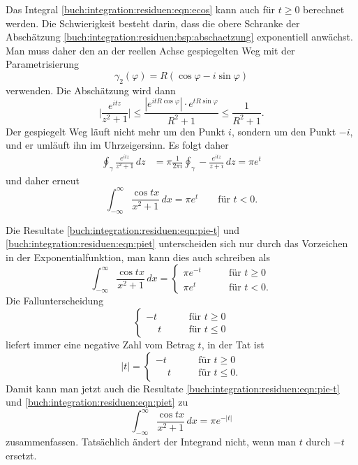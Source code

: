 Das Integral
\eqref{buch:integration:residuen:eqn:ecos}
kann auch für $t\ge 0$ berechnet werden.
Die Schwierigkeit besteht darin, dass die obere Schranke der Abschätzung
\eqref{buch:integration:residuen:bsp:abschaetzung}
exponentiell anwächst.
Man muss daher den an der reellen Achse gespiegelten Weg mit der
Parametrisierung
\[
\gamma_2(\varphi)
=
R(\cos\varphi - i\sin\varphi)
\]
verwenden.
Die Abschätzung wird dann
\[
\biggl|
\frac{e^{itz}}{z^2+1}
\biggr|
\le
\frac{|e^{itR\cos\varphi}|\cdot e^{tR\sin\varphi}}{R^2+1}
\le
\frac{1}{R^2+1}.
\]
Der gespiegelt Weg läuft nicht mehr um den Punkt $i$, sondern um den
Punkt $-i$, und er umläuft ihn im Uhrzeigersinn.
Es folgt daher
\begin{align*}
\oint_\gamma
\frac{e^{itz}}{z^2+1}
\,dz
&=
\pi
\frac{1}{2\pi i}
\oint_{\gamma}
-
\frac{e^{itz}}{z+i}
\,dz
=
\pi e^{t}
\end{align*}
und daher erneut
\begin{equation}
\int_{-\infty}^\infty
\frac{\cos tx}{x^2 + 1}
\,dx
=
\pi e^{t}
\qquad
\text{für $t<0$}.
\label{buch:integration:residuen:eqn:piet}
\end{equation}

Die Resultate
\eqref{buch:integration:residuen:eqn:pie-t}
und
\eqref{buch:integration:residuen:eqn:piet}
unterscheiden sich nur durch das Vorzeichen in der Exponentialfunktion,
man kann dies auch schreiben als
\[
\int_{-\infty}^\infty
\frac{\cos tx}{x^2+1}
\,dx
=
\begin{cases}
\pi e^{-t}&\qquad \text{für $t \ge 0$}\\
\pi e^{t} &\qquad \text{für $t < 0$}.
\end{cases}
\]
Die Fallunterscheidung
\[
\begin{cases}
         - t&\qquad \text{für $t \ge 0$}\\
\phantom{-}t&\qquad \text{für $t \le 0$}
\end{cases}
\]
liefert immer eine negative Zahl vom Betrag $t$, in der Tat ist
\[
|t|
=
\begin{cases}
         - t&\qquad \text{für $t \ge 0$}\\
\phantom{-}t&\qquad \text{für $t \le 0$}.
\end{cases}
\]
Damit kann man jetzt auch die Resultate
\eqref{buch:integration:residuen:eqn:pie-t}
und
\eqref{buch:integration:residuen:eqn:piet}
zu
\begin{equation}
\int_{-\infty}^\infty
\frac{\cos tx}{x^2 + 1}
\,dx
=
\pi e^{-|t|}
\end{equation}
zusammenfassen.
Tatsächlich ändert der Integrand nicht, wenn man $t$ durch $-t$ ersetzt.
